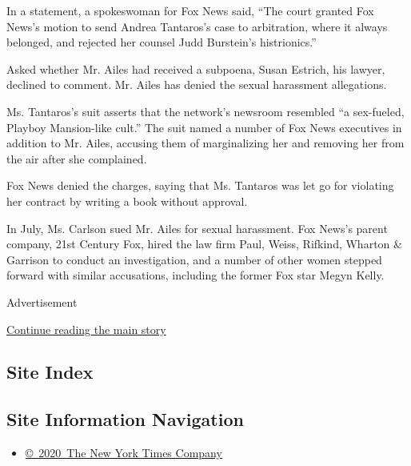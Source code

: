 In a statement, a spokeswoman for Fox News said, ``The court granted Fox
News's motion to send Andrea Tantaros's case to arbitration, where it
always belonged, and rejected her counsel Judd Burstein's histrionics.''

Asked whether Mr. Ailes had received a subpoena, Susan Estrich, his
lawyer, declined to comment. Mr. Ailes has denied the sexual harassment
allegations.

Ms. Tantaros's suit asserts that the network's newsroom resembled ``a
sex-fueled, Playboy Mansion-like cult.'' The suit named a number of Fox
News executives in addition to Mr. Ailes, accusing them of marginalizing
her and removing her from the air after she complained.

Fox News denied the charges, saying that Ms. Tantaros was let go for
violating her contract by writing a book without approval.

In July, Ms. Carlson sued Mr. Ailes for sexual harassment. Fox News's
parent company, 21st Century Fox, hired the law firm Paul, Weiss,
Rifkind, Wharton \& Garrison to conduct an investigation, and a number
of other women stepped forward with similar accusations, including the
former Fox star Megyn Kelly.

Advertisement

\protect\hyperlink{after-bottom}{Continue reading the main story}

\hypertarget{site-index}{%
\subsection{Site Index}\label{site-index}}

\hypertarget{site-information-navigation}{%
\subsection{Site Information
Navigation}\label{site-information-navigation}}

\begin{itemize}
\tightlist
\item
  \href{https://help.nytimes3xbfgragh.onion/hc/en-us/articles/115014792127-Copyright-notice}{©~2020~The
  New York Times Company}
\end{itemize}

